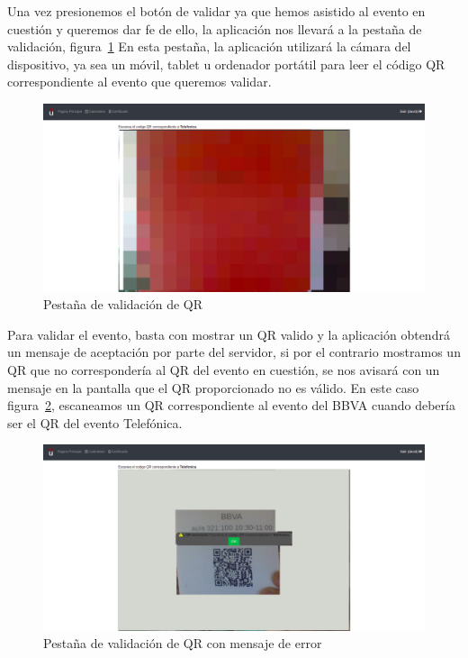 \documentclass[a4paper, 12pt]{book}
\begin{document}
\begin{enumerate}
	Una vez presionemos el botón de validar ya que hemos asistido al evento en cuestión y queremos dar fe de ello, la aplicación nos llevará a la pestaña de validación, figura~\ref{fig:validarQR}
	En esta pestaña, la aplicación utilizará la cámara del dispositivo, ya sea un móvil, tablet u ordenador portátil para leer el código QR correspondiente al evento que queremos validar.
	\begin{figure}[h!]
  	\centering
  	\includegraphics[width=12cm, keepaspectratio]{img/validarQR.png}
  	\caption{Pestaña de validación de QR}\label{fig:validarQR}
	\end{figure}

Para validar el evento, basta con mostrar un QR valido y la aplicación obtendrá un mensaje de aceptación por parte del servidor, si por el contrario mostramos un QR que no correspondería al QR del evento en cuestión, se nos avisará con un mensaje en la pantalla que el QR proporcionado no es válido. En este caso figura~\ref{fig:validarQRFail}, escaneamos un QR correspondiente al evento del BBVA cuando debería ser el QR del evento Telefónica.

	\begin{figure}[!h]
  	\centering
  	\includegraphics[width=12cm, keepaspectratio]{img/validarQRFail.png}
  	\caption{Pestaña de validación de QR con mensaje de error}\label{fig:validarQRFail}
	\end{figure}  
 

\end{enumerate}
\end{document}
